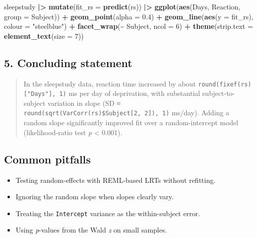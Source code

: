 \documentclass[
]{article}
\newenvironment{Shaded}{\begin{snugshade}}{\end{snugshade}}
\newcommand{\AttributeTok}[1]{\textcolor[rgb]{0.13,0.29,0.53}{#1}}
\newcommand{\DecValTok}[1]{\textcolor[rgb]{0.00,0.00,0.81}{#1}}
\newcommand{\FloatTok}[1]{\textcolor[rgb]{0.00,0.00,0.81}{#1}}
\newcommand{\FunctionTok}[1]{\textcolor[rgb]{0.13,0.29,0.53}{\textbf{#1}}}
\newcommand{\NormalTok}[1]{#1}
\newcommand{\SpecialCharTok}[1]{\textcolor[rgb]{0.81,0.36,0.00}{\textbf{#1}}}
\newcommand{\StringTok}[1]{\textcolor[rgb]{0.31,0.60,0.02}{#1}}
\providecommand{\tightlist}{%
  \setlength{\itemsep}{0pt}\setlength{\parskip}{0pt}}
\begin{document}
\begin{Shaded}
\begin{Highlighting}[]
\NormalTok{sleepstudy }\SpecialCharTok{|\textgreater{}}
  \FunctionTok{mutate}\NormalTok{(}\AttributeTok{fit\_rs =} \FunctionTok{predict}\NormalTok{(rs)) }\SpecialCharTok{|\textgreater{}}
  \FunctionTok{ggplot}\NormalTok{(}\FunctionTok{aes}\NormalTok{(Days, Reaction, }\AttributeTok{group =}\NormalTok{ Subject)) }\SpecialCharTok{+}
  \FunctionTok{geom\_point}\NormalTok{(}\AttributeTok{alpha =} \FloatTok{0.4}\NormalTok{) }\SpecialCharTok{+}
  \FunctionTok{geom\_line}\NormalTok{(}\FunctionTok{aes}\NormalTok{(}\AttributeTok{y =}\NormalTok{ fit\_rs), }\AttributeTok{colour =} \StringTok{"steelblue"}\NormalTok{) }\SpecialCharTok{+}
  \FunctionTok{facet\_wrap}\NormalTok{(}\SpecialCharTok{\textasciitilde{}}\NormalTok{ Subject, }\AttributeTok{ncol =} \DecValTok{6}\NormalTok{) }\SpecialCharTok{+}
  \FunctionTok{theme}\NormalTok{(}\AttributeTok{strip.text =} \FunctionTok{element\_text}\NormalTok{(}\AttributeTok{size =} \DecValTok{7}\NormalTok{))}
\end{Highlighting}
\end{Shaded}

\subsection{5. Concluding statement}\label{concluding-statement}

\begin{quote}
In the sleepstudy data, reaction time increased by about
\texttt{round(fixef(rs){[}"Days"{]},\ 1)} ms per day of deprivation,
with substantial subject-to-subject variation in slope (SD ≈
\texttt{round(sqrt(VarCorr(rs)\$Subject{[}2,\ 2{]}),\ 1)} ms/day).
Adding a random slope significantly improved fit over a random-intercept
model (likelihood-ratio test \emph{p} \textless{} 0.001).
\end{quote}

\subsection{Common pitfalls}\label{common-pitfalls}

\begin{itemize}
\tightlist
\item
  Testing random-effects with REML-based LRTs without refitting.
\item
  Ignoring the random slope when slopes clearly vary.
\item
  Treating the \texttt{Intercept} variance as the within-subject error.
\item
  Using \emph{p}-values from the Wald \emph{z} on small samples.
\end{itemize}
\end{document}
